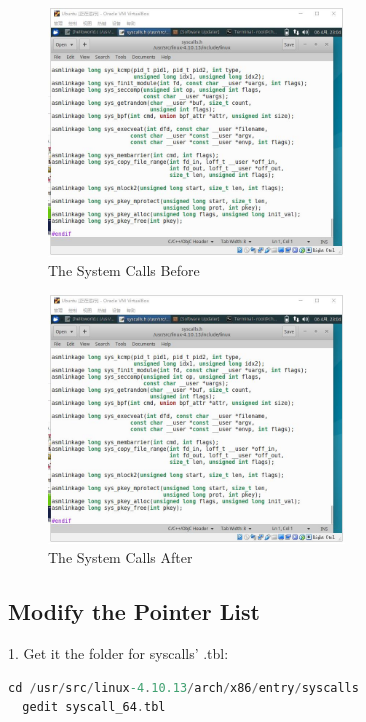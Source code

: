 \documentclass[12pt,a4paper]{article}
\begin{document}
\begin{minipage}{0.5\textwidth}
	\begin{figure}[H]
		\centering
		\includegraphics[width= 0.7\textwidth]{./fig/9_addto_syscalls.jpg}
		\caption{The System Calls Before}
		\label{fig:systemcalls before}
	\end{figure}
\end{minipage}
\begin{minipage}{0.5\textwidth}
	\begin{figure}[H]
		\centering
		\includegraphics[width= 0.7\textwidth]{./fig/9_addto_syscalls.jpg}
		\caption{The System Calls After}
		\label{fig: systemcalls after}
	\end{figure}
\end{minipage}

\subsection{Modify the Pointer List}

1. Get it the folder for syscalls' .tbl:
\begin{lstlisting}[language = C]
  cd /usr/src/linux-4.10.13/arch/x86/entry/syscalls
  gedit syscall_64.tbl
\end{lstlisting}
\end{document}
